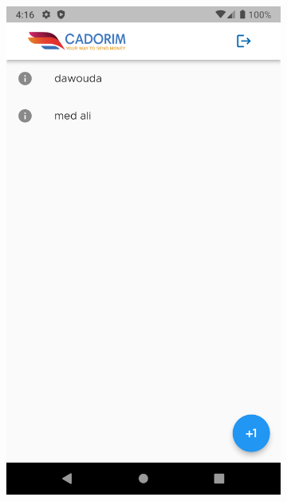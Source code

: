 \begin{itemize}[label=$\ast$]

\begin{figure}
	\centering
	\begin{subfigure}[b]{0.3\textwidth}
		\centering
		\includegraphics[width=\textwidth]{./Template LaTeX/Images/From_emu/A_home.png}

\end{subfigure}
\end{figure}
\end{itemize}
